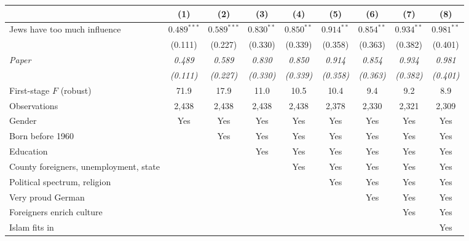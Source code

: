 \begin{tabular}{lcccccccc}
\toprule
 & (1) & (2) & (3) & (4) & (5) & (6) & (7) & (8) \\
\midrule
Jews have too much influence & $0.489^{***}$ & $0.589^{***}$ & $0.830^{**}$ & $0.850^{**}$ & $0.914^{**}$ & $0.854^{**}$ & $0.934^{**}$ & $0.981^{**}$ \\
 & (0.111) & (0.227) & (0.330) & (0.339) & (0.358) & (0.363) & (0.382) & (0.401) \\
\textit{Paper} & \textit{0.489} & \textit{0.589} & \textit{0.830} & \textit{0.850} & \textit{0.914} & \textit{0.854} & \textit{0.934} & \textit{0.981} \\
 & \textit{(0.111)} & \textit{(0.227)} & \textit{(0.330)} & \textit{(0.339)} & \textit{(0.358)} & \textit{(0.363)} & \textit{(0.382)} & \textit{(0.401)} \\
\midrule
First-stage $F$ (robust) & 71.9 & 17.9 & 11.0 & 10.5 & 10.4 & 9.4 & 9.2 & 8.9 \\
Observations & 2,438 & 2,438 & 2,438 & 2,438 & 2,378 & 2,330 & 2,321 & 2,309 \\
Gender & Yes & Yes & Yes & Yes & Yes & Yes & Yes & Yes \\
Born before 1960 &  & Yes & Yes & Yes & Yes & Yes & Yes & Yes \\
Education &  &  & Yes & Yes & Yes & Yes & Yes & Yes \\
County foreigners, unemployment, state &  &  &  & Yes & Yes & Yes & Yes & Yes \\
Political spectrum, religion &  &  &  &  & Yes & Yes & Yes & Yes \\
Very proud German &  &  &  &  &  & Yes & Yes & Yes \\
Foreigners enrich culture &  &  &  &  &  &  & Yes & Yes \\
Islam fits in &  &  &  &  &  &  &  & Yes \\
\bottomrule
\end{tabular}
